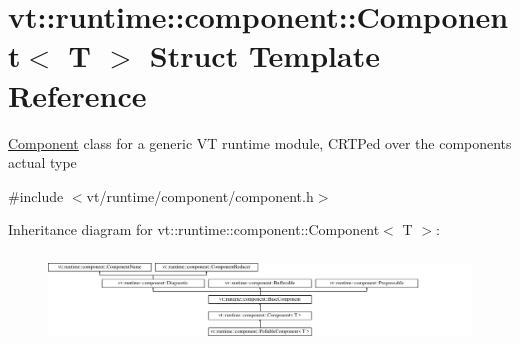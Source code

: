 \hypertarget{structvt_1_1runtime_1_1component_1_1_component}{}\section{vt\+:\+:runtime\+:\+:component\+:\+:Component$<$ T $>$ Struct Template Reference}
\label{structvt_1_1runtime_1_1component_1_1_component}


{\ttfamily \hyperlink{structvt_1_1runtime_1_1component_1_1_component}{Component}} class for a generic VT runtime module, C\+R\+TP\textquotesingle{}ed over the component\textquotesingle{}s actual type  




{\ttfamily \#include $<$vt/runtime/component/component.\+h$>$}

Inheritance diagram for vt\+:\+:runtime\+:\+:component\+:\+:Component$<$ T $>$\+:\begin{figure}[H]
\begin{center}
\leavevmode
\includegraphics[height=2.422145cm]{structvt_1_1runtime_1_1component_1_1_component}
\end{center}
\end{figure}

